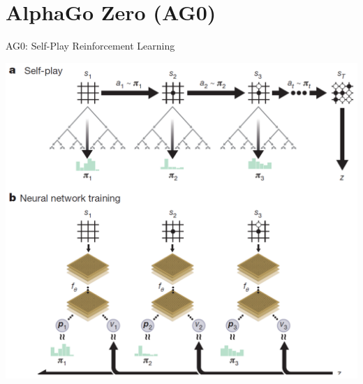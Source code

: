 \documentclass{beamer}
\begin{document}

  \section{AlphaGo Zero (AG0)}
  {

    \begin{frame}{AG0: Self-Play Reinforcement Learning}
      \pause
      \begin{center}
        \includegraphics[height=.9\textheight]{../img/AG0-paper/self-play-RL-in-AG0.png}
      \end{center}
    \end{frame}

}
\end{document}
